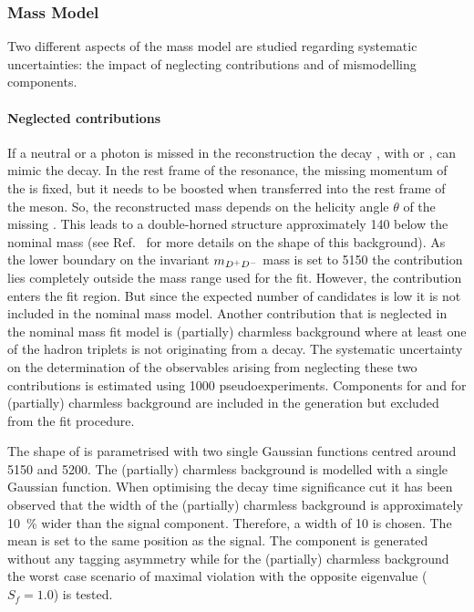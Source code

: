 
\subsubsection{Mass Model}
\label{sec:b02dd:systematics:massmodel}

Two different aspects of the mass model are studied regarding systematic
uncertainties: the impact of neglecting contributions and of mismodelling
components.

\paragraph{Neglected contributions}

If a neutral \piz or a photon is missed in the reconstruction the decay
\BToDstD, with \DstpToDpizero or \DstpToDgamma, can mimic the \BToDD decay. In
the rest frame of the \Dstarp resonance, the missing momentum of the \piz is
fixed, but it needs to be boosted when transferred into the rest frame of the
\PB meson. So, the reconstructed mass depends on the helicity angle $\theta$
of the missing \piz. This leads to a double-horned structure approximately
\SI{140}{\MeVcc} below the nominal \PB mass (see Ref.~\cite{LHCb-ANA-2014-015}
for more details on the shape of this background). As the lower boundary on
the invariant $m_{{{D}^+}{{D}^-}}$ mass is set to \SI{5150}{\MeVcc} the \BdToDstD
contribution lies completely outside the mass range used for the fit. However,
the \BsToDstD contribution enters the fit region. But since the expected number of
\BsToDstD candidates is low it is not included in the nominal mass model.
Another contribution that is neglected in the nominal mass fit model is
(partially) charmless background where at least one of the hadron triplets is
not originating from a \PD decay. The systematic uncertainty on the
determination of the \CP observables arising from neglecting these two
contributions is estimated using \num{1000} pseudoexperiments. Components for
\BsToDstD and for (partially) charmless background are included in the
generation but excluded from the fit procedure.

The shape of \BsToDstD is parametrised with two single Gaussian functions
centred around \SI{5150}{\MeVcc} and \SI{5200}{\MeVcc}. The (partially)
charmless background is modelled with a single Gaussian function. When
optimising the decay time significance cut it has been observed that the width
of the (partially) charmless background is approximately \SI{10}{\percent}
wider than the signal component. Therefore, a width of \SI{10}{\MeVcc} is
chosen. The mean is set to the same position as the \Bd signal. The \BsToDstD
component is generated without any tagging asymmetry while for the (partially)
charmless background the worst case scenario of maximal \CP violation with the
opposite \CP eigenvalue ($S_f = \num{+1.0}$) is tested.

